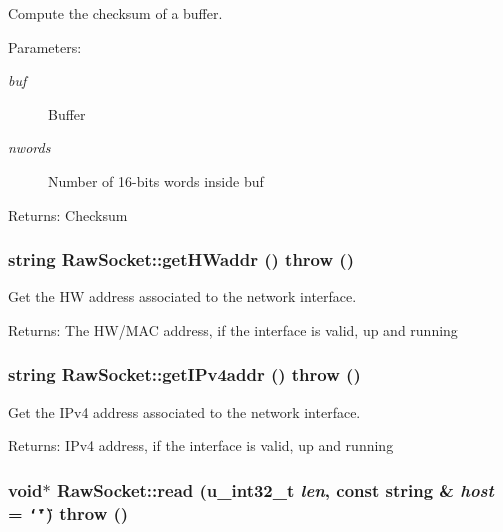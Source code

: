 Compute the checksum of a buffer. 

\begin{Desc}
\item[Parameters:]
\begin{description}
\item[{\em buf}]Buffer \item[{\em nwords}]Number of 16-bits words inside buf \end{description}
\end{Desc}
\begin{Desc}
\item[Returns:]Checksum \end{Desc}
\hypertarget{classRawSocket_b2bcc0a5f1714d4d7a119332428c10ae}{
\subsubsection[{getHWaddr}]{\setlength{\rightskip}{0pt plus 5cm}string RawSocket::getHWaddr ()  throw ()}}
\label{classRawSocket_b2bcc0a5f1714d4d7a119332428c10ae}


Get the HW address associated to the network interface. 

\begin{Desc}
\item[Returns:]The HW/MAC address, if the interface is valid, up and running \end{Desc}
\hypertarget{classRawSocket_334b006f4b102e3546ec444172d39a55}{
\subsubsection[{getIPv4addr}]{\setlength{\rightskip}{0pt plus 5cm}string RawSocket::getIPv4addr ()  throw ()}}
\label{classRawSocket_334b006f4b102e3546ec444172d39a55}


Get the IPv4 address associated to the network interface. 

\begin{Desc}
\item[Returns:]IPv4 address, if the interface is valid, up and running \end{Desc}
\hypertarget{classRawSocket_18c53c49d965a0ce7652162af8b7a571}{
\subsubsection[{read}]{\setlength{\rightskip}{0pt plus 5cm}void$\ast$ RawSocket::read (u\_\-int32\_\-t {\em len}, \/  const string \& {\em host} = {\tt \char`\"{}\char`\"{}})  throw ()}}
\label{classRawSocket_18c53c49d965a0ce7652162af8b7a571}


